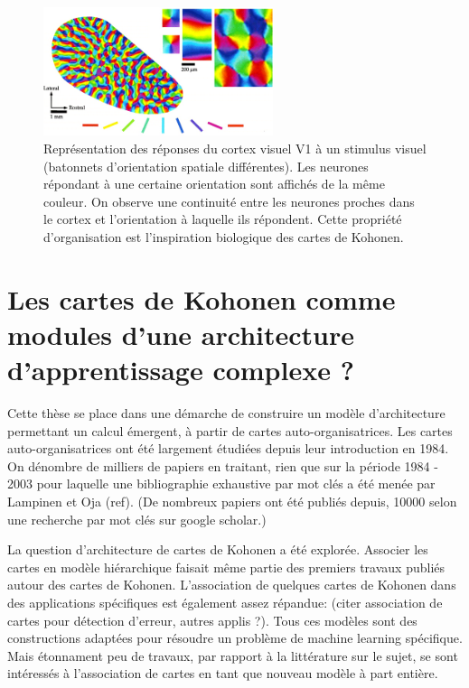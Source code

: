 \documentclass[../main]{subfiles}
\begin{document}
\begin{figure}
\centering
\includegraphics[width=0.6\textwidth]{v1.jpg}
\caption{Représentation des réponses du cortex visuel V1 à un stimulus visuel (batonnets d'orientation spatiale différentes). Les neurones répondant à une certaine orientation sont affichés de la même couleur. On observe une continuité entre les neurones proches dans le cortex et l'orientation à laquelle ils répondent. Cette propriété d'organisation est l'inspiration biologique des cartes de Kohonen. }
\label{fig:v1}
\end{figure}

\section{Les cartes de Kohonen comme modules d'une architecture d'apprentissage complexe ? }

Cette thèse se place dans une démarche de construire un modèle d'architecture permettant un calcul émergent, à partir de cartes auto-organisatrices.
Les cartes auto-organisatrices ont été largement étudiées depuis leur introduction en 1984. On dénombre de milliers de papiers en traitant, rien que sur la période 1984 - 2003 pour laquelle une bibliographie exhaustive par mot clés a été menée par Lampinen et Oja (ref). (De nombreux papiers ont été publiés depuis, 10000 selon une recherche par mot clés sur google scholar.)

La question d'architecture de cartes de Kohonen a été explorée. Associer les cartes en modèle hiérarchique faisait même partie des premiers travaux publiés autour des cartes de Kohonen.
L'association de quelques cartes de Kohonen dans des applications spécifiques est également assez répandue:
(citer association de cartes pour détection d'erreur, autres applis ?). Tous ces modèles sont des constructions adaptées pour résoudre un problème de machine learning spécifique.
Mais étonnament peu de travaux, par rapport à la littérature sur le sujet, se sont intéressés à l'association de cartes en tant que nouveau modèle à part entière.
\end{document}

